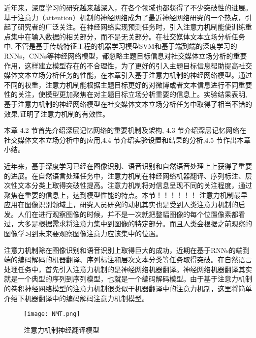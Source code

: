 

近年来，深度学习的研究越来越深入，在各个领域也都获得了不少突破性的进展。基于注意力（attention）机制的神经网络成为了最近神经网络研究的一个热点，引起了研究者的广泛关注。在神经网络实现预测任务时，引入注意力机制能使训练重点集中在输入数据的相关部分，而不是无关部分。在社交媒体文本立场分析任务中, 不管是基于传统特征工程的机器学习模型SVM和基于端到端的深度学习的RNNs，CNNs等神经网络模型，都忽略主题目标信息对社交媒体立场分析的重要作用，这样建立模型存在的不合理性，为了更好的引入主题目标信息帮助提高社交媒体文本立场分析任务的性能，在本章引入基于注意力机制的神经网络模型。通过不同的权重，注意力机制能根据主题目标更好的对微博或者文本信息进行不同重要性的关注，使模型更加聚焦在对主题目标立场分析重要的信息上。实验结果表明,基于注意力机制的神经网络模型在社交媒体文本立场分析任务中取得了相当不错的效果,证明了注意力机制的有效性。

本章 4.2 节首先介绍深层记忆网络的重要机制及架构, 4.3 节介绍深层记忆网络在社交媒体文本立场分析中的应用,4.4 节介绍实验设置和结果的分析,4.5 节作出本章小结。


近年来，基于深度学习已经在图像识别、语音识别和自然语音处理上上获得了重要的进展。在自然语言处理任务中，注意力机制在神经网络机器翻译、序列标注、层次性文本分类上取得突破性提高。注意力机制将对信息呈现不同的关注程度，通过聚焦在重要的信息上，达到模型性能的特点。本节！！！！！！
注意力机制最早应用在图像识别领域上，研究人员研究的动机其实也是受到人类注意力机制的启发。人们在进行观察图像的时候，并不是一次就把整幅图像的每个位置像素都看过，大多是根据需求将注意力集中到图像的特定部分。而且人类会根据之前观察的图像学习到未来要观察图像注意力应该集中的位置。

注意力机制除在图像识别和语音识别上取得巨大的成功，近期在基于RNNs的端到端的编码解码的机器翻译、序列标注和层次文本分类等任务取得突破。在自然语言处理任务中，首先引入注意力机制的是神经网络机器翻译。神经网络机器翻译其实就是一个典型的序列到序列模型，也就是一个编码解码模型﻿。由于基于注意力机制的卷积神经网络模型的注意力机制很类似于机器翻译中的注意力机制，这里将简单介绍下机器翻译中的编码解码注意力机制模型。
\begin{figure}[htbp]
	\centering
	\texttt{[image: NMT.png]}
	\caption[rnn_vanish]{注意力机制神经翻译模型}
\end{figure}

